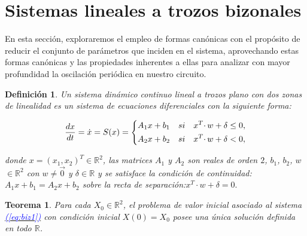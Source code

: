 \documentclass[12pt,a4paper]{report} %
\newtheorem{theorem}{Teorema}[chapter]
\newtheorem{definicion}{Definición}[chapter]
\newcommand{\eref}[1]{\hyperref[#1]{\textcolor{blue}{(\ref*{#1})}}}
\begin{document}
	\newpage
	
	\section{Sistemas lineales a trozos bizonales}
	\label{sistrobiz}
	
	 En esta sección, exploraremos el empleo de formas canónicas con el propósito de reducir el conjunto de parámetros que inciden en el sistema, aprovechando estas formas canónicas y las propiedades inherentes a ellas para analizar con mayor profundidad la oscilación periódica en nuestro circuito.
	
	\vspace{0.5cm}\begin{definicion}
		Un sistema dinámico continuo lineal a trozos plano con dos zonas de linealidad es un sistema de ecuaciones diferenciales con la siguiente forma:
	
	\begin{equation}
		\frac{dx}{dt}=\dot{x}=S(x)=
		\label{eq:biz1}
		\scalebox{1}{$\displaystyle
			\left\{
			\begin{aligned}
			 A_1x+b_1\quad si \quad x^T\cdotp w+\delta \leq 0, \\
			 A_2x+b_2\quad si \quad x^T\cdotp w+\delta < 0,
			\end{aligned}
			\right.
			$}
	\end{equation}\smallskip
	
	\noindent donde $x=(x_1,x_2)^T\in \mathbb{R}^2$, las matrices $A_1$ y $A_2$ son reales de orden $2$, $b_1$, $b_2$, $w$ $\in \mathbb{R}^2$ con $w\neq\vec{0}$ y $\delta \in \mathbb{R}$ y se satisface la condición de continuidad: $A_1x+b_1=A_2x+b_2$ sobre la recta de separación:\quad $x^T\cdotp w+\delta = 0.$ 
	
	\end{definicion}
	
	\vspace{0.5cm}\begin{theorem}
		\label{teo:euvic}
		Para cada $X_0 \in \mathbb{R}^2$, el problema de valor inicial asociado al sistema \eref{eq:biz1} con condición inicial $X(0)=X_0$ posee una única solución definida en todo $\mathbb{R}$.
	\end{theorem}
	
\end{document}
